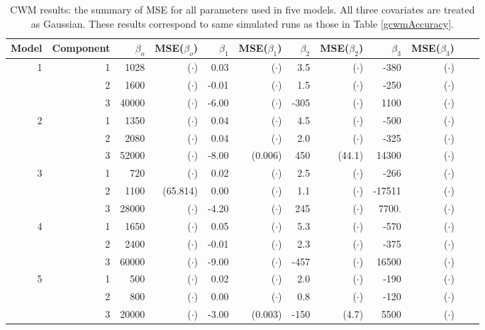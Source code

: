 \documentclass[11pt,letterpaper]{article}
\numberwithin{equation}{section}
\numberwithin{equation}{section}
\numberwithin{equation}{section}
\begin{document}
\begin{table}[!htb]
\centering
\caption{CWM results: the summary of MSE for all parameters used in five models. All three covariates are treated as Gaussian. These results correspond to same simulated runs as those in Table \ref{gcwmAccuracy}.}
\label{my-label}
\begin{tabular}{rrrrrrrrrrrr}
\hline\hline
Model & Component & $\beta_o$ &  MSE($\beta_o$)   &  $\beta_1$ & MSE($\beta_1$)& $\beta_2$ &MSE($\beta_2$)   & $\beta_3$ &  MSE($\beta_3$)  \\
\hline
1     & 1         & 1028& ($\cdot$)   & 0.03&  ($\cdot$)   & 3.5&  ($\cdot$)    & -380&  ($\cdot$)    \\
      & 2         & 1600&  ($\cdot$)      & -0.01& ($\cdot$)  & 1.5& ($\cdot$)     & -250& ($\cdot$)  \\
      & 3         & 40000& ($\cdot$)     & -6.00& ($\cdot$)  & -305& ($\cdot$)  & 1100& ($\cdot$)    \\
2     & 1         & 1350& ($\cdot$)     & 0.04& ($\cdot$) & 4.5& ($\cdot$)    & -500& ($\cdot$)  \\
      & 2         & 2080&  ($\cdot$)    & 0.04& ($\cdot$)   & 2.0& ($\cdot$)     & -325& ($\cdot$)   \\
      & 3         & 52000&  ($\cdot$)     & -8.00& (0.006)  & 450& (44.1)   & 14300& ($\cdot$)  \\
3     & 1         & 720&  ($\cdot$)     & 0.02& ($\cdot$)   & 2.5& ($\cdot$)    & -266& ($\cdot$)    \\
      & 2         & 1100&  (65.814)     & 0.00& ($\cdot$)   & 1.1& ($\cdot$)     & -17511& ($\cdot$)  \\
      & 3         & 28000& ($\cdot$)   & -4.20& ($\cdot$)  & 245& ($\cdot$)   & 7700.& ($\cdot$)  \\
4     & 1         & 1650& ($\cdot$)    & 0.05& ($\cdot$)  & 5.3& ($\cdot$)    & -570& ($\cdot$)  \\
      & 2         & 2400&  ($\cdot$)     & -0.01& ($\cdot$)  & 2.3& ($\cdot$)    & -375& ($\cdot$)    \\
      & 3         & 60000&  ($\cdot$)     & -9.00& ($\cdot$)  & -457& ($\cdot$)  & 16500& ($\cdot$)   \\
5     & 1         & 500&  ($\cdot$)     & 0.02& ($\cdot$)   & 2.0& ($\cdot$)   & -190& ($\cdot$)  \\
      & 2         & 800&  ($\cdot$)      & 0.00& ($\cdot$)   & 0.8& ($\cdot$)    & -120& ($\cdot$)  \\
      & 3         & 20000&  ($\cdot$)     & -3.00& (0.003)  & -150& (4.7) & 5500& ($\cdot$) \\
      \hline\hline
\end{tabular}
\end{table}
\end{document}
